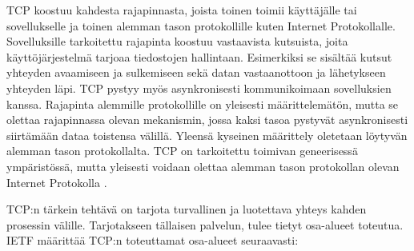 \documentclass[utf8]{gradu3}
\begin{document}
TCP koostuu kahdesta rajapinnasta, joista toinen toimii käyttäjälle tai sovellukselle ja toinen alemman tason protokollille kuten Internet Protokollalle. Sovelluksille tarkoitettu rajapinta koostuu vastaavista kutsuista, joita käyttöjärjestelmä tarjoaa tiedostojen hallintaan. Esimerkiksi se sisältää kutsut yhteyden avaamiseen ja sulkemiseen sekä datan vastaanottoon ja lähetykseen yhteyden läpi. TCP pystyy myös asynkronisesti kommunikoimaan sovelluksien kanssa. Rajapinta alemmille protokollille on yleisesti määrittelemätön, mutta se olettaa rajapinnassa olevan mekanismin, jossa kaksi tasoa pystyvät asynkronisesti siirtämään dataa toistensa välillä. Yleensä kyseinen määrittely oletetaan löytyvän alemman tason protokollalta. TCP on tarkoitettu toimivan geneerisessä ympäristössä, mutta yleisesti voidaan olettaa alemman tason protokollan olevan Internet Protokolla \parencite{tcp1_4}.

TCP:n tärkein tehtävä on tarjota turvallinen ja luotettava yhteys kahden prosessin välille. Tarjotakseen tällaisen palvelun, tulee tietyt osa-alueet toteutua. IETF \parencite{tcp1_4} määrittää TCP:n toteuttamat osa-alueet seuraavasti:
\end{document}
